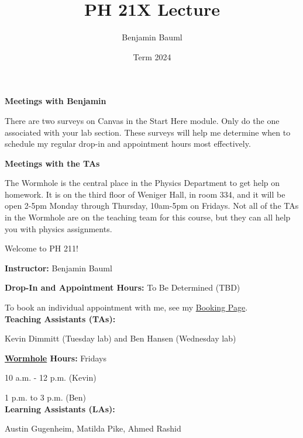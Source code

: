 \documentclass[]{article}
\title{PH 21X Lecture \Lec}
\author{Benjamin Bauml}
\date{Term 2024}
\begin{document}
\begin{TeacherMargin}
\noindent\textbf{Meetings with Benjamin}

There are two surveys on Canvas in the Start Here module. Only do the one associated with your lab section. These surveys will help me determine when to schedule my regular drop-in and appointment hours most effectively.

\noindent\textbf{Meetings with the TAs}

The Wormhole is the central place in the Physics Department to get help on homework. It is on the third floor of Weniger Hall, in room 334, and it will be open 2-5pm Monday through Thursday, 10am-5pm on Fridays. Not all of the TAs in the Wormhole are on the teaching team for this course, but they can all help you with physics assignments.
\end{TeacherMargin}
\begin{PresentSpace}
\begin{center}
	\huge Welcome to PH 211!
\end{center}
\noindent\textbf{Instructor:} Benjamin Bauml

\noindent\textbf{Drop-In and Appointment Hours:} To Be Determined (TBD)

To book an individual appointment with me, see my \href{https://outlook.office.com/bookwithme/user/8a879d0af7bf45e890abd3d888d8bfe4@oregonstate.edu?anonymous&ep=plink}{\color{blue}Booking Page}. \\

\noindent\textbf{Teaching Assistants (TAs):}

\noindent Kevin Dimmitt (Tuesday lab) and Ben Hansen (Wednesday lab)

\noindent\textbf{\href{https://wormhole.physics.oregonstate.edu/}{\color{blue}Wormhole} Hours:} Fridays

10 a.m. - 12 p.m. (Kevin)

1 p.m. to 3 p.m. (Ben) \\

\noindent\textbf{Learning Assistants (LAs):}

\noindent Austin Gugenheim, Matilda Pike, Ahmed Rashid
\end{PresentSpace}
\newpage
\end{document}
